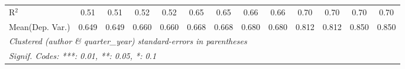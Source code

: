 \begin{tabular}{lcccccccccccc}
   R$^2$                                    & 0.51          & 0.51     & 0.52          & 0.52     & 0.65          & 0.65          & 0.66         & 0.66        & 0.70    & 0.70     & 0.70    & 0.70\\  
Mean(Dep. Var.) & 0.649 & 0.649 & 0.660 & 0.660 & 0.668 & 0.668 & 0.680 & 0.680 & 0.812 & 0.812 & 0.850 & 0.850 \\
   \midrule \midrule
   \multicolumn{13}{l}{\emph{Clustered (author \& quarter\_year) standard-errors in parentheses}}\\
   \multicolumn{13}{l}{\emph{Signif. Codes: ***: 0.01, **: 0.05, *: 0.1}}\\
\end{tabular}
\par\endgroup
